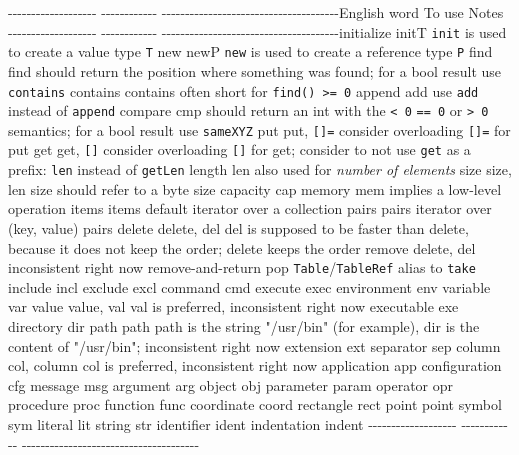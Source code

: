 -\/-\/-\/-\/-\/-\/-\/-\/-\/-\/-\/-\/-\/-\/-\/-\/-\/-\/-
-\/-\/-\/-\/-\/-\/-\/-\/-\/-\/-\/-
-\/-\/-\/-\/-\/-\/-\/-\/-\/-\/-\/-\/-\/-\/-\/-\/-\/-\/-\/-\/-\/-\/-\/-\/-\/-\/-\/-\/-\/-\/-\/-\/-\/-\/-\/-\/-\/-English
word To use Notes
-\/-\/-\/-\/-\/-\/-\/-\/-\/-\/-\/-\/-\/-\/-\/-\/-\/-\/-
-\/-\/-\/-\/-\/-\/-\/-\/-\/-\/-\/-
-\/-\/-\/-\/-\/-\/-\/-\/-\/-\/-\/-\/-\/-\/-\/-\/-\/-\/-\/-\/-\/-\/-\/-\/-\/-\/-\/-\/-\/-\/-\/-\/-\/-\/-\/-\/-\/-initialize
initT \texttt{init} is used to create a value type \texttt{T} new newP
\texttt{new} is used to create a reference type \texttt{P} find find
should return the position where something was found; for a bool result
use \texttt{contains} contains contains often short for
\texttt{find()\ \textgreater{}=\ 0} append add use \texttt{add} instead
of \texttt{append} compare cmp should return an int with the
\texttt{\textless{}\ 0} \texttt{==\ 0} or \texttt{\textgreater{}\ 0}
semantics; for a bool result use \texttt{sameXYZ} put put,
\texttt{{[}{]}=} consider overloading \texttt{{[}{]}=} for put get get,
\texttt{{[}{]}} consider overloading \texttt{{[}{]}} for get; consider
to not use \texttt{get} as a prefix: \texttt{len} instead of
\texttt{getLen} length len also used for \emph{number of elements} size
size, len size should refer to a byte size capacity cap memory mem
implies a low-level operation items items default iterator over a
collection pairs pairs iterator over (key, value) pairs delete delete,
del del is supposed to be faster than delete, because it does not keep
the order; delete keeps the order remove delete, del inconsistent right
now remove-and-return pop \texttt{Table}/\texttt{TableRef} alias to
\texttt{take} include incl exclude excl command cmd execute exec
environment env variable var value value, val val is preferred,
inconsistent right now executable exe directory dir path path path is
the string "/usr/bin" (for example), dir is the content of "/usr/bin";
inconsistent right now extension ext separator sep column col, column
col is preferred, inconsistent right now application app configuration
cfg message msg argument arg object obj parameter param operator opr
procedure proc function func coordinate coord rectangle rect point point
symbol sym literal lit string str identifier ident indentation indent
-\/-\/-\/-\/-\/-\/-\/-\/-\/-\/-\/-\/-\/-\/-\/-\/-\/-\/-
-\/-\/-\/-\/-\/-\/-\/-\/-\/-\/-\/-
-\/-\/-\/-\/-\/-\/-\/-\/-\/-\/-\/-\/-\/-\/-\/-\/-\/-\/-\/-\/-\/-\/-\/-\/-\/-\/-\/-\/-\/-\/-\/-\/-\/-\/-\/-\/-\/-
